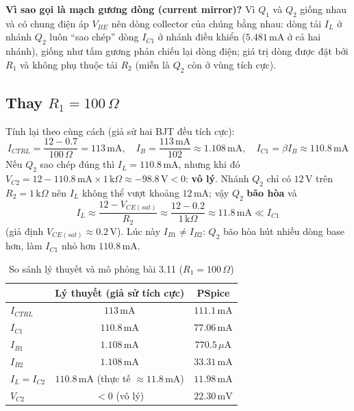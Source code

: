 \textbf{Vì sao gọi là mạch gương dòng (current mirror)?} Vì $Q_1$ và $Q_2$ giống nhau và có chung điện áp $V_{BE}$ nên dòng collector của chúng bằng nhau: dòng tải $I_L$ ở nhánh $Q_2$ luôn ``sao chép'' dòng $I_{C1}$ ở nhánh điều khiển ($5.481\,\text{mA}$ ở cả hai nhánh), giống như tấm gương phản chiếu lại dòng điện; giá trị dòng được đặt bởi $R_1$ và không phụ thuộc tải $R_2$ (miễn là $Q_2$ còn ở vùng tích cực).

\subsection{\texorpdfstring{Thay $R_1 = 100\,\Omega$}{Thay R1 = 100 Ohm}}
Tính lại theo cùng cách (giả sử hai BJT đều tích cực):
\[ I_{CTRL} = \frac{12 - 0.7}{100\,\Omega} = 113\,\text{mA}, \quad I_B = \frac{113\,\text{mA}}{102} \approx 1.108\,\text{mA}, \quad I_{C1} = \beta I_B \approx 110.8\,\text{mA} \]
Nếu $Q_2$ sao chép đúng thì $I_L = 110.8\,\text{mA}$, nhưng khi đó $V_{C2} = 12 - 110.8\,\text{mA}\times 1\,\text{k}\Omega \approx -98.8\,\text{V} < 0$: \textbf{vô lý}. Nhánh $Q_2$ chỉ có $12\,\text{V}$ trên $R_2 = 1\,\text{k}\Omega$ nên $I_L$ không thể vượt khoảng $12\,\text{mA}$; vậy $Q_2$ \textbf{bão hòa} và
\[ I_L \approx \frac{12 - V_{CE(sat)}}{R_2} \approx \frac{12 - 0.2}{1\,\text{k}\Omega} \approx 11.8\,\text{mA} \ll I_{C1} \]
(giả định $V_{CE(sat)} \approx 0.2\,\text{V}$). Lúc này $I_{B1} \ne I_{B2}$: $Q_2$ bão hòa hút nhiều dòng base hơn, làm $I_{C1}$ nhỏ hơn $110.8\,\text{mA}$.


\begin{table}[H]
\centering
\begin{tabular}{l|c|c}
\toprule
 & Lý thuyết (giả sử tích cực) & PSpice \\
\midrule
$I_{CTRL}$ & $113\,\text{mA}$ & $111.1\,\text{mA}$ \\
$I_{C1}$ & $110.8\,\text{mA}$ & $77.06\,\text{mA}$ \\
$I_{B1}$ & $1.108\,\text{mA}$ & $770.5\,\mu\text{A}$ \\
$I_{B2}$ & $1.108\,\text{mA}$ & $33.31\,\text{mA}$ \\
$I_L = I_{C2}$ & $110.8\,\text{mA}$ (thực tế $\approx 11.8\,\text{mA}$) & $11.98\,\text{mA}$ \\
$V_{C2}$ & $<0$ (vô lý) & $22.30\,\text{mV}$ \\
\bottomrule
\end{tabular}
\caption{So sánh lý thuyết và mô phỏng bài 3.11 ($R_1 = 100\,\Omega$)}
\end{table}

